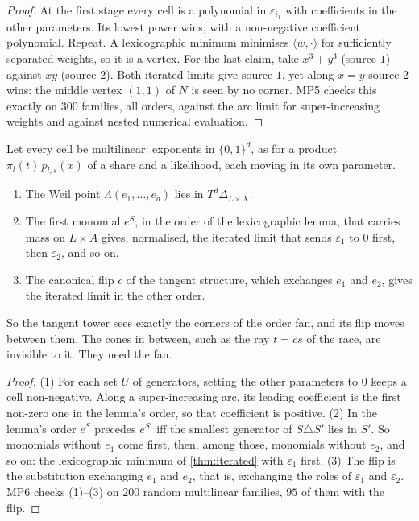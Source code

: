 \documentclass[11pt]{article}
\theoremstyle{definition}\newtheorem{definition}[theorem]{Definition}\newtheorem{remark}[theorem]{Remark}\newtheorem{example}[theorem]{Example}
\begin{document}
\begin{proof}
At the first stage every cell is a polynomial in $\varepsilon_{i_1}$ with coefficients in the other parameters. Its lowest power wins, with a
non-negative coefficient polynomial. Repeat. A lexicographic minimum minimises $\langle w,\cdot\rangle$ for sufficiently separated weights, so it is
a vertex. For the last claim, take $x^3+y^3$ (source $1$) against $xy$ (source $2$). Both iterated limits give source $1$, yet along $x=y$
source $2$ wins: the middle vertex $(1,1)$ of $N$ is seen by no corner. MP5 checks this exactly on $300$ families, all orders,
against the arc limit for super-increasing weights and against nested numerical evaluation.
\end{proof}

\begin{proposition}\label{prop:towerlex}
Let every cell be multilinear: exponents in $\{0,1\}^d$, as for a product $\pi_l(t)\,p_{l,s}(x)$ of a share and a likelihood, each moving in
its own parameter.
\begin{enumerate}
\item[(1)] The Weil point $\Lambda(e_1,\dots,e_d)$ lies in $T^d\Delta_{L\times X}$.
\item[(2)] The first monomial $e^S$, in the order of the lexicographic lemma, that carries mass on $L\times A$ gives, normalised, the iterated
  limit that sends $\varepsilon_1$ to $0$ first, then $\varepsilon_2$, and so on.
\item[(3)] The canonical flip $c$ of the tangent structure, which exchanges $e_1$ and $e_2$, gives the iterated limit in the other order.
\end{enumerate}
So the tangent tower sees exactly the corners of the order fan, and its flip moves between them. The cones in between, such as the ray
$t=cs$ of the race, are invisible to it. They need the fan.
\end{proposition}

\begin{proof}
(1) For each set $U$ of generators, setting the other parameters to $0$ keeps a cell non-negative. Along a super-increasing arc, its leading
coefficient is the first non-zero one in the lemma's order, so that coefficient is positive. (2) In the lemma's order $e^S$ precedes $e^{S'}$
iff the smallest generator of $S\triangle S'$ lies in $S'$. So monomials without $e_1$ come first, then, among those, monomials without $e_2$, and
so on: the lexicographic minimum of \cref{thm:iterated} with $\varepsilon_1$ first. (3) The flip is the substitution exchanging $e_1$ and $e_2$, that
is, exchanging the roles of $\varepsilon_1$ and $\varepsilon_2$. MP6 checks (1)--(3) on $200$ random multilinear families, $95$ of them with the flip.
\end{proof}
\end{document}
